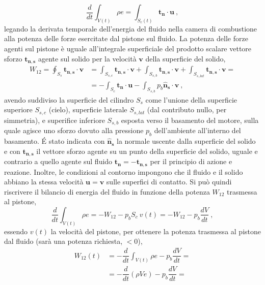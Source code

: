 \begin{itemize}
\begin{equation}
 \dfrac{d}{dt} \displaystyle\int_{V(t)} \rho e = \int_{S_c(t)} \bm{t_n} \cdot \bm{u} \ ,
\end{equation}
legando la derivata temporale dell'energia del fluido nella camera di combustione alla potenza delle forze esercitate dal pistone sul fluido. La potenza delle forze agenti sul pistone è uguale all'integrale superficiale del prodotto scalare vettore sforzo $\bm{t_{n,s}}$ agente sul solido per la velocità $\bm{v}$ della superficie del solido,
\begin{equation}
\begin{aligned}
 W_{12} = \oint_{S_{s}} \bm{t_{n,s}} \cdot \bm{v}
 & = \int_{S_{s,c}} \bm{t_{n,s}} \cdot \bm{v} + \int_{S_{s,b}} \bm{t_{n,s}} \cdot \bm{v}  + \int_{S_{s,lat}} \bm{t_{n,s}} \cdot \bm{v} = \\
 & = - \int_{S_{c}} \bm{t_{n}} \cdot \bm{u} - \int_{S_{s,b}} p_b\bm{\hat{n}_{s}} \cdot \bm{v} \ ,
\end{aligned}
\end{equation}
avendo suddiviso la superficie del cilindro $S_s$ come l'unione della superficie superiore $S_{s,c}$ (cielo), superficie laterale $S_{s,lat}$ (dal contributo nullo, per simmetria), e superifice inferiore $S_{s,b}$ esposta verso il basamento del motore, sulla quale agisce uno sforzo dovuto alla pressione $p_b$ dell'ambiente all'interno del basamento. \'E stato indicata con $\bm{\hat{n}_s}$ la normale uscente dalla superficie del solido e con $\bm{t_{n,s}}$ il vettore sforzo agente su un punto della superficie del solido, uguale e contrario a quello agente sul fluido $\bm{t_n} = -\bm{t_{n,s}}$ per il principio di azione e reazione. Inoltre, le condizioni al contorno impongono che il fluido e il solido abbiano la stessa velocità $\bm{u} = \bm{v}$ sulle superfici di contatto.
Si può quindi riscrivere il bilancio di energia del fluido in funzione della potenza $W_{12}$ trasmessa al pistone,
\begin{equation}
  \dfrac{d}{dt} \displaystyle\int_{V(t)} \rho e = - W_{12} - p_b S_{c} \ v(t) = - W_{12} - p_b \dfrac{d V}{d t} \ ,
\end{equation}
essendo $v(t)$ la velocità del pistone, per ottenere la potenza trasmessa al pistone dal fluido (sarà una potenza richiesta, $<0$),
\begin{equation}
\begin{aligned}
  W_{12}(t) & = - \dfrac{d}{dt} \displaystyle\int_{V(t)} \rho e - p_b \dfrac{d V}{d t} = \\
  & = - \dfrac{d}{dt} \left( \rho V e \right) - p_b \dfrac{d V}{d t} = \\

\end{aligned}
\end{equation}
\end{itemize}
